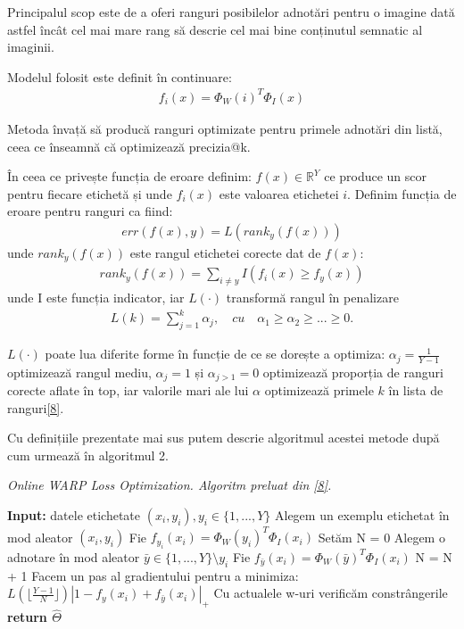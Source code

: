 Principalul scop este de a oferi ranguri posibilelor adnotări pentru o imagine dată astfel încât cel mai mare rang să descrie cel mai bine conținutul semnatic al imaginii. 

Modelul folosit este definit în continuare:
\begin{align}
	f_{i}(x) = \Phi_{W}(i)^T \Phi_{I}(x)
\end{align}

Metoda învață să producă ranguri optimizate pentru primele adnotări din listă, ceea ce înseamnă că optimizează precizia@k.

În ceea ce privește funcția de eroare definim: $f(x) \in \mathbb{R}^Y$ ce produce un scor pentru fiecare etichetă și unde $f_i(x)$ este valoarea etichetei $i$. Definim funcția de eroare pentru ranguri ca fiind:
\begin{align}
	err(f(x),y) = L(rank_y(f(x)))
\end{align}
unde $rank_y(f(x))$ este rangul etichetei corecte dat de $f(x)$:
\begin{align}
	rank_y(f(x)) = \sum_{i \neq y}I(f_i(x) \geq f_y(x))
\end{align}
unde I este funcția indicator, iar $L(\cdot)$ transformă rangul în penalizare
\begin{align}
	L(k) = \sum_{j=1}^k\alpha_j, \quad cu \quad \alpha_1 \geq \alpha_2 \geq ... \geq 0.
\end{align}

$L(\cdot)$ poate lua diferite forme în funcție de ce se dorește a optimiza: $\alpha_j=\frac{1}{Y-1}$ optimizează rangul mediu, $\alpha_j=1$ și $\alpha_{j>1}=0$ optimizează proporția de ranguri corecte aflate în top, iar valorile mari ale lui $\alpha$ optimizează primele $k$ în lista de ranguri\hyperlink{JasonWestonSamyBengioNicolasUsunier}{[8]}.

Cu definițiile prezentate mai sus putem descrie algoritmul acestei metode după cum urmează în algoritmul 2.
\begin{algorithm}[!h]
\caption[Online WARP Loss Optimization]{\textit{Online WARP Loss Optimization. Algoritm preluat din \hyperlink{JasonWestonSamyBengioNicolasUsunier}{[8]}.}}
\begin{algorithmic}[!h]
    \State \textbf{Input:} datele etichetate $(x_i, y_i), y_i \in \{1,...,Y\}$ 
    \Repeat
    \State Alegem un exemplu etichetat în mod aleator $(x_i, y_i)$
    \State Fie $f_{y_i}(x_i) = \Phi_W(y_i)^T\Phi_I(x_i)$
    \State Setăm N = 0
    \Repeat
    \State Alegem o adnotare în mod aleator $\bar{y} \in \{1,...,Y\} \setminus y_i$
    \State Fie $f_{\bar{y}}(x_i) = \Phi_W(\bar{y})^T\Phi_I(x_i)$
    \State N = N + 1
        \State Facem un pas al gradientului pentru a minimiza:
        \State $L(\lfloor \frac{Y-1}{N} \rfloor) |1 - f_y(x_i) + f_{\bar{y}}(x_i)|_+$
        \State Cu actualele w-uri verificăm constrângerile
    \EndIf
    \State \textbf{return $\hat{\Theta}$}
\EndProcedure
\end{algorithmic}
\end{algorithm}

